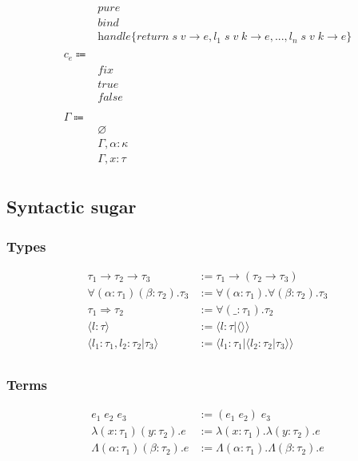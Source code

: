 \documentclass[12pt]{article}
\newcommand\llabel[0]{l}
\newcommand\kind[0]{\kappa} %
\newcommand\type[0]{\tau} %
\newcommand\tarr[2]{#1 \rightarrow #2} %
\newcommand\tforall[3]{\forall(#1 : #2) . #3} %
\newcommand\tforalls[2]{\forall#1 . #2} %
\newcommand\tempty[0]{\langle\rangle} %
\newcommand\textend[3]{\langle#1:#2|#3\rangle} %
\newcommand\textends[2]{\langle#1:#2\rangle} %
\newcommand\textendss[1]{\langle#1\rangle} %
\newcommand\timplies[2]{#1 \Rightarrow #2} %
\newcommand\term[0]{e} %
\newcommand\econst[0]{c_\term} %
\newcommand\eabs[3]{\lambda(#1 : #2) . #3} %
\newcommand\eabss[2]{\lambda#1 . #2} %
\newcommand\etabs[3]{\Lambda(#1 : #2) . #3} %
\newcommand\etabss[2]{\Lambda#1 . #2} %
\newcommand\ereturn[0]{\textit{return}} %
\newcommand\epure[0]{\textit{pure}} %
\newcommand\ebind[0]{\textit{bind}} %
\newcommand\ehandle[1]{\textit{handle}\{#1\}} %
\newcommand\efix[0]{\textit{fix}} %
\newcommand\etrue[0]{\textit{true}} %
\newcommand\efalse[0]{\textit{false}} %
\begin{document}
\begin{align*}
				& \epure						\tag{pure} \\
				& \ebind						\tag{bind} \\
				& \ehandle{\ereturn\;s\;v \rightarrow \term, \llabel_1\;s\;v\;k \rightarrow \term, ..., \llabel_n\;s\;v\;k \rightarrow \term} \tag{handle effect} \\
				& \\
	\econst \Coloneqq	&							\tag{constants} \\
				& \efix						\tag{fix (general recursion)} \\
				& \etrue						\tag{true} \\
				& \efalse						\tag{false} \\
				& \\
	\Gamma \Coloneqq 	&							\tag{contexts} \\
				& \varnothing					\tag{empty} \\
				& \Gamma , \alpha : \kind				\tag{type variable has kind} \\
				& \Gamma , x : \tau					\tag{variable has type} \\
\end{align*}

\subsection{Syntactic sugar}

\subsubsection{Types}
\begin{align*}
\tarr{\type_1}{\tarr{\type_2}{\type_3}} 				&:= \tarr{\type_1}{(\tarr{\type_2}{\type_3})} \\
\tforalls{(\alpha : \tau_1)(\beta : \tau_2)}{\tau_3} 			&:= \tforall{\alpha}{\tau_1}{\tforall{\beta}{\tau_2}{\tau_3}} \\
\timplies{\type_1}{\type_2} 						&:= \tforall{\_}{\type_1}{\type_2} \\
\textends{\llabel}{\type}							&:= \textend{\llabel}{\type}{\tempty} \\
\textendss{\llabel_1 : \type_1, \llabel_2 : \type_2 | \type_3}	&:= \textend{\llabel_1}{\type_1}{\textend{\llabel_2}{\type_2}{\type_3}} \\
\end{align*}

\subsubsection{Terms}
\begin{align*}
\term_1 \; \term_2 \; \term_3			 			&:= (\term_1 \; \term_2) \; \term_3 \\
\eabss{(x : \tau_1)(y : \tau_2)}{\term}		 			&:= \eabs{x}{\tau_1}{\eabs{y}{\tau_2}{\term}} \\
\etabss{(\alpha : \tau_1)(\beta : \tau_2)}{\term}		 	&:= \etabs{\alpha}{\tau_1}{\etabs{\beta}{\tau_2}{\term}} \\
\end{align*}
\end{document}
